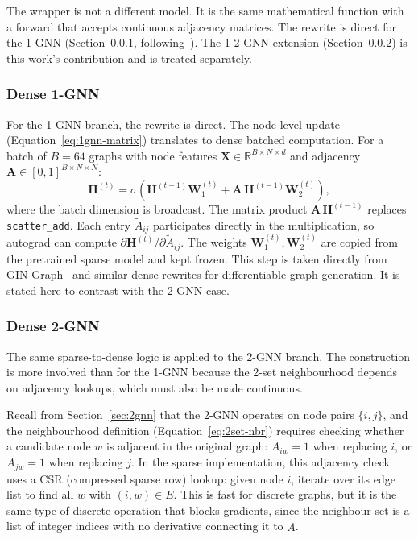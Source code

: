 \documentclass[12pt,a4paper]{article}
\begin{document}
The wrapper is not a different model. It is the same mathematical function with a forward that accepts continuous adjacency matrices. The rewrite is direct for the 1-GNN (Section~\ref{sec:dense-1gnn}, following~\cite{sun2025gingraph}). The 1-2-GNN extension (Section~\ref{sec:dense-2gnn}) is this work's contribution and is treated separately.

\subsubsection{Dense 1-GNN}
\label{sec:dense-1gnn}

For the 1-GNN branch, the rewrite is direct. The node-level update (Equation~\ref{eq:1gnn-matrix}) translates to dense batched computation. For a batch of $B = 64$ graphs with node features $\mathbf{X} \in \mathbb{R}^{B \times N \times d}$ and adjacency $\mathbf{A} \in [0,1]^{B \times N \times N}$:
\begin{equation}
  \mathbf{H}^{(t)} = \sigma\!\left(\mathbf{H}^{(t-1)} \mathbf{W}_1^{(t)} + \mathbf{A} \, \mathbf{H}^{(t-1)} \mathbf{W}_2^{(t)}\right),
  \label{eq:dense-1gnn}
\end{equation}
where the batch dimension is broadcast. The matrix product $\mathbf{A}\,\mathbf{H}^{(t-1)}$ replaces \texttt{scatter\_add}. Each entry $\tilde{A}_{ij}$ participates directly in the multiplication, so autograd can compute $\partial \mathbf{H}^{(t)} / \partial \tilde{A}_{ij}$. The weights $\mathbf{W}_1^{(t)}, \mathbf{W}_2^{(t)}$ are copied from the pretrained sparse model and kept frozen. This step is taken directly from GIN-Graph~\cite{sun2025gingraph} and similar dense rewrites for differentiable graph generation. It is stated here to contrast with the 2-GNN case.

\subsubsection{Dense 2-GNN}
\label{sec:dense-2gnn}

The same sparse-to-dense logic is applied to the 2-GNN branch. The construction is more involved than for the 1-GNN because the 2-set neighbourhood depends on adjacency lookups, which must also be made continuous.

Recall from Section~\ref{sec:2gnn} that the 2-GNN operates on node pairs $\{i, j\}$, and the neighbourhood definition (Equation~\ref{eq:2set-nbr}) requires checking whether a candidate node $w$ is adjacent in the original graph: $A_{iw} = 1$ when replacing $i$, or $A_{jw} = 1$ when replacing $j$. In the sparse implementation, this adjacency check uses a CSR (compressed sparse row) lookup: given node $i$, iterate over its edge list to find all $w$ with $(i, w) \in E$. This is fast for discrete graphs, but it is the same type of discrete operation that blocks gradients, since the neighbour set is a list of integer indices with no derivative connecting it to $\tilde{A}$.
\end{document}

